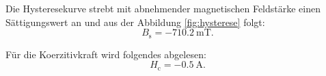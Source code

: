 Die Hysteresekurve strebt mit abnehmender magnetischen Feldstärke einen Sättigungswert an und aus der Abbildung \ref{fig:hysterese} folgt:
\begin{equation*}
B_{\text{s}} = \SI{-710,2}{\milli\tesla}.
\end{equation*}

Für die Koerzitivkraft wird folgendes abgelesen:
\begin{equation*}
H_{\text{c}} = \SI{-0,5}{\ampere}.
\end{equation*}